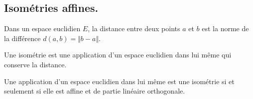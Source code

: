 \subsection{Isométries affines.}
Dans un espace euclidien $E$, la distance entre deux points $a$ et $b$ est la norme de la différence $d(a,b)=\Vert b-a \Vert$.
\begin{defi}
Une isométrie est une application d'un espace euclidien dans lui même qui conserve la distance. 
\end{defi}
\begin{prop}
 Une application d'un espace euclidien dans lui même est une isométrie si et seulement si elle est affine et de partie linéaire orthogonale.
\end{prop}
